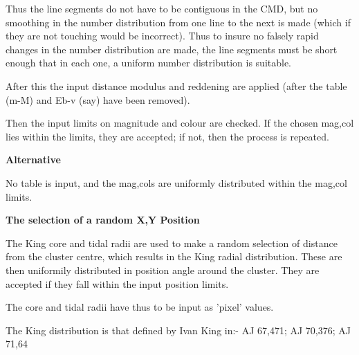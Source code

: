 {{  Thus the line segments do not have to be contiguous in the CMD, but
  no smoothing in the number distribution from one line to the next is
  made (which if they are not touching would be incorrect). Thus to
  insure no falsely rapid changes in the number distribution are made,
  the line segments must be short enough that in each one, a uniform
  number distribution is suitable.
                                                                               
  After this the input distance modulus and reddening are applied (after
  the table (m-M) and Eb-v (say) have been removed).
                                                                               
  Then the input limits on magnitude and colour are checked. If the
  chosen mag,col lies within the limits, they are accepted; if not,
  then the process is repeated.
                                                                               
  {\bf Alternative}
                                                                               
  No table is input, and the mag,cols are uniformly distributed within
  the mag,col limits.
                                                                               
                                                                               
  {\bf The selection of a random X,Y Position}
                                                                               
  The King core and tidal radii are used to make a random selection
  of distance from the cluster centre, which results in the King
  radial distribution. These are then uniformily distributed in
  position angle around the cluster. They are accepted if they fall
  within the input position limits.
                                                                               
  The core and tidal radii have thus to be input as 'pixel' values.
                                                                               
  The King distribution is that defined by Ivan King in:- AJ 67,471;
  AJ 70,376; AJ 71,64
                                                                               
}}

